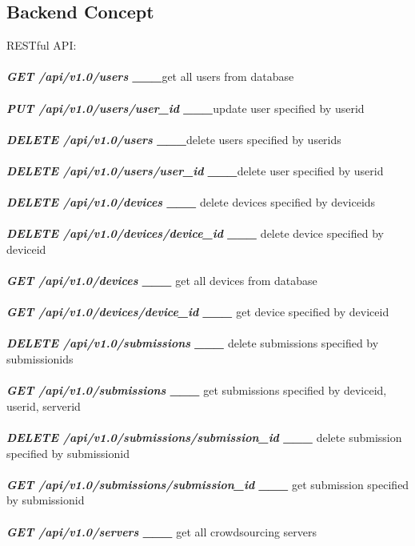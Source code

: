 \documentclass[12pt,oneside,a4paper]{article}
\begin{document}
\subsection{\large Backend Concept}
\small{RESTful API:}\\\\
\scriptsize{\textbf{\emph{GET  /api/v1.0/users \_\_\_}}get all users from database}\\\\
\scriptsize{\textbf{\emph{PUT  /api/v1.0/users/user\_id \_\_\_}}update user specified by userid }\\\\
\scriptsize{\textbf{\emph{DELETE  /api/v1.0/users \_\_\_}}delete users specified by userids}\\\\
\scriptsize{\textbf{\emph{DELETE  /api/v1.0/users/user\_id \_\_\_}}delete user specified by userid}\\\\
\scriptsize{\textbf{\emph{DELETE  /api/v1.0/devices \_\_\_}} delete devices specified by deviceids}\\\\
\scriptsize{\textbf{\emph{DELETE  /api/v1.0/devices/device\_id \_\_\_}} delete device specified by deviceid}\\\\
\scriptsize{\textbf{\emph{GET  /api/v1.0/devices \_\_\_}} get all devices from database}\\\\
\scriptsize{\textbf{\emph{GET  /api/v1.0/devices/device\_id \_\_\_}} get device specified by deviceid}\\\\
\scriptsize{\textbf{\emph{DELETE  /api/v1.0/submissions \_\_\_}} delete submissions specified by submissionids}\\\\
\scriptsize{\textbf{\emph{GET  /api/v1.0/submissions \_\_\_}} get submissions specified by deviceid, userid, serverid}\\\\
\scriptsize{\textbf{\emph{DELETE  /api/v1.0/submissions/submission\_id \_\_\_}} delete submission specified by submissionid}\\\\
\scriptsize{\textbf{\emph{GET  /api/v1.0/submissions/submission\_id \_\_\_}} get submission specified by submissionid}\\\\
\scriptsize{\textbf{\emph{GET  /api/v1.0/servers \_\_\_}} get all crowdsourcing servers}\\\\
\end{document}
